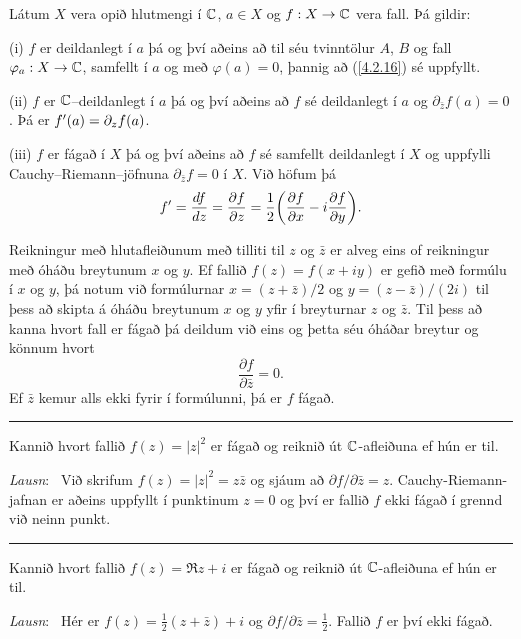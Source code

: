 \begin{se}  Látum $X$ vera opið hlutmengi í ${\mathbb C}$, $a\in X$ og $f:X\to {\mathbb C}$ vera
fall.  Þá gildir:

\smallskip\noindent
(i) $f$ er deildanlegt í $a$ þá og því aðeins að til séu tvinntölur $A$,
$B$ og fall $\varphi_a:X\to {\mathbb C}$, samfellt í $a$ og með
$\varphi(a)=0$, þannig að (\ref{4.2.16}) sé uppfyllt.

\smallskip\noindent
(ii) $f$ er ${\mathbb C}$--deildanlegt í $a$ þá og því aðeins að $f$ sé
deildanlegt í $a$ og ${\partial}_{\bar z}f(a)=0$.  Þá er
$f{\sp{\prime}}(a)={\partial}_zf(a)$.

\smallskip\noindent
(iii) $f$ er fágað í $X$ þá og því aðeins að $f$ sé samfellt deildanlegt
í $X$ og uppfylli Cauchy--Riemann--jöfnuna ${\partial}_{\bar z}f=0$ í
$X$. Við höfum þá
\begin{equation*}
f{\sp{\prime}}=\dfrac{df}{dz}=\dfrac{\partial f}{\partial z}=\dfrac 12\bigg(
\dfrac{\partial f}{\partial x}-i\dfrac{\partial f}{\partial y}\bigg).
\label{4.2.17}
\end{equation*}
\end{se}



Reikningur með hlutafleiðunum með tilliti til $z$ og $\bar z$ er alveg
eins of reikningur með óháðu breytunum $x$ og $y$.  Ef fallið 
$f(z)=f(x+iy)$ er gefið með formúlu í $x$ og $y$, þá notum við
formúlurnar $x=(z+\bar z)/2$ og $y=(z-\bar z)/(2i)$ til þess að skipta
á óháðu breytunum $x$ og $y$ yfir í breyturnar $z$ og $\bar z$.  Til
þess að kanna hvort fall er fágað þá deildum við eins og þetta séu
óháðar breytur og könnum hvort 
$$
\dfrac{\partial f}{\partial\bar z}=0.
$$
Ef $\bar z$ kemur alls ekki fyrir í formúlunni, þá er $f$ fágað.

 
\bigskip\hrule\bigskip

\begin{sy}  Kannið hvort fallið $f(z)= |z|^2$ er fágað og reiknið út
${\mathbb C}$-afleiðuna ef hún er til.  

\smallskip\noindent
{\it Lausn}: \  Við skrifum  $f(z)=|z|^2=z\bar z$ og
sjáum að  ${\partial}f/{\partial}\bar z=z$.  Cauchy-Riemann-jafnan er aðeins
uppfyllt í punktinum $z=0$ og því er fallið $f$ ekki fágað í grennd við
neinn punkt.
\end{sy}

\bigskip\hrule\bigskip

\begin{sy}  Kannið hvort fallið $f(z)= \Re z + i$ er fágað og reiknið
út ${\mathbb C}$-afleiðuna ef hún er til.

\smallskip
{\it Lausn}: \ Hér er $f(z)=\tfrac 12(z+\bar z)+i$ og 
${\partial} f/{\partial}\bar z=\tfrac 12$.  Fallið $f$ er því ekki
fágað.
\end{sy}


